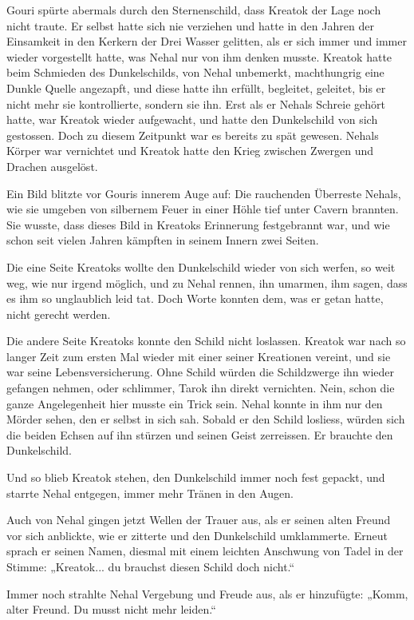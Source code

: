 Gouri spürte abermals durch den Sternenschild, dass Kreatok der Lage noch nicht traute. Er selbst hatte sich nie verziehen und hatte in den Jahren der Einsamkeit in den Kerkern der Drei Wasser gelitten, als er sich immer und immer wieder vorgestellt hatte, was Nehal nur von ihm denken musste. Kreatok hatte beim Schmieden des Dunkelschilds, von Nehal unbemerkt, machthungrig eine Dunkle Quelle angezapft, und diese hatte ihn erfüllt, begleitet, geleitet, bis er nicht mehr sie kontrollierte, sondern sie ihn. Erst als er Nehals Schreie gehört hatte, war Kreatok wieder aufgewacht, und hatte den Dunkelschild von sich gestossen. Doch zu diesem Zeitpunkt war es bereits zu spät gewesen. Nehals Körper war vernichtet und Kreatok hatte den Krieg zwischen Zwergen und Drachen ausgelöst.

Ein Bild blitzte vor Gouris innerem Auge auf: Die rauchenden Überreste Nehals, wie sie umgeben von silbernem Feuer in einer Höhle tief unter Cavern brannten. Sie wusste, dass dieses Bild in Kreatoks Erinnerung festgebrannt war, und wie schon seit vielen Jahren kämpften in seinem Innern zwei Seiten.

Die eine Seite Kreatoks wollte den Dunkelschild wieder von sich werfen, so weit weg, wie nur irgend möglich, und zu Nehal rennen, ihn umarmen, ihm sagen, dass es ihm so unglaublich leid tat. Doch Worte konnten dem, was er getan hatte, nicht gerecht werden.

Die andere Seite Kreatoks konnte den Schild nicht loslassen. Kreatok war nach so langer Zeit zum ersten Mal wieder mit einer seiner Kreationen vereint, und sie war seine Lebensversicherung. Ohne Schild würden die Schildzwerge ihn wieder gefangen nehmen, oder schlimmer, Tarok ihn direkt vernichten. Nein, schon die ganze Angelegenheit hier musste ein Trick sein. Nehal konnte in ihm nur den Mörder sehen, den er selbst in sich sah. Sobald er den Schild losliess, würden sich die beiden Echsen auf ihn stürzen und seinen Geist zerreissen. Er brauchte den Dunkelschild.

Und so blieb Kreatok stehen, den Dunkelschild immer noch fest gepackt, und starrte Nehal entgegen, immer mehr Tränen in den Augen.

Auch von Nehal gingen jetzt Wellen der Trauer aus, als er seinen alten Freund vor sich anblickte, wie er zitterte und den Dunkelschild umklammerte. Erneut sprach er seinen Namen, diesmal mit einem leichten Anschwung von Tadel in der Stimme: „Kreatok... du brauchst diesen Schild doch nicht.“

Immer noch strahlte Nehal Vergebung und Freude aus, als er hinzufügte: „Komm, alter Freund. Du musst nicht mehr leiden.“

